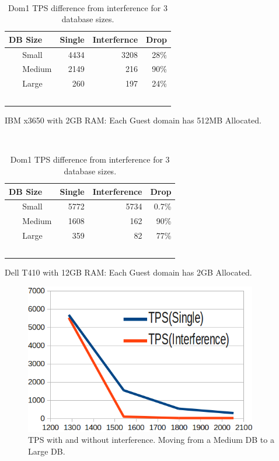 \begin{table}[h]
\begin{subtable}[h]{0.45\textwidth}
  \begin{tabular}{ l | r | r | r }
    DB Size & Single & Interfernce & Drop \\
    \hline
    Small & 4434 & 3208 & 28\% \\ \hline
    Medium & 2149 & 216 & 90\% \\ \hline
    Large & 260 & 197 & 24\% \\  \hline
    \hline
  \end{tabular}
\caption{IBM x3650 with 2GB RAM:  Each Guest domain has 512MB Allocated.}
\end{subtable}
\hfill
\begin{subtable}[h]{0.45\textwidth}
  \begin{tabular}{ l | r | r | r }
    DB Size & Single & Interference & Drop \\
    \hline
    Small & 5772 & 5734 & 0.7\% \\ \hline
    Medium & 1608 & 162 & 90\% \\ \hline
    Large & 359 & 82 & 77\% \\  \hline
    \hline
  \end{tabular}
\caption{Dell T410 with 12GB RAM:  Each Guest domain has 2GB Allocated. }
\end{subtable}
\caption{Dom1 TPS difference from interference for 3 database sizes.}
\label{fig:tps1}
\end{table}

\begin{figure}[!h]
  \begin{center}
  \includegraphics[width=4in]{images/MedScale.png}
  \caption{TPS with and without interference.  Moving from a Medium DB to a Large DB.}
  \label{fig:smallIO}
  \end{center}
\end{figure}

